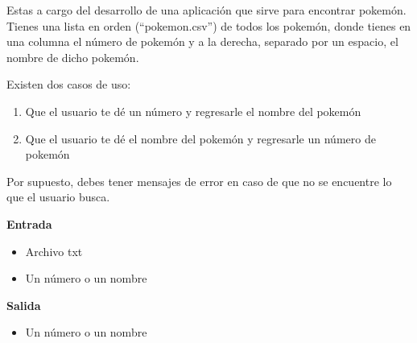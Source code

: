 
\question Estas a cargo del desarrollo de una aplicación que sirve para
          encontrar pokemón. Tienes una lista en orden (“pokemon.csv”)
          de todos los pokemón, donde tienes en una columna el número de
          pokemón y a la derecha, separado por un espacio, el nombre de
          dicho pokemón.

Existen dos casos de uso:
\begin{enumerate}
  \item Que el usuario te dé un número y regresarle el nombre del pokemón
  \item Que el usuario te dé el nombre del pokemón y regresarle un número de
        pokemón
\end{enumerate}

Por supuesto, debes tener mensajes de error en caso de que no se encuentre
lo que el usuario busca.

\textbf{Entrada}

\begin{itemize}
  \item Archivo txt
  \item Un número o un nombre
\end{itemize}

\textbf{Salida}

\begin{itemize}
  \item Un número o un nombre
\end{itemize}
